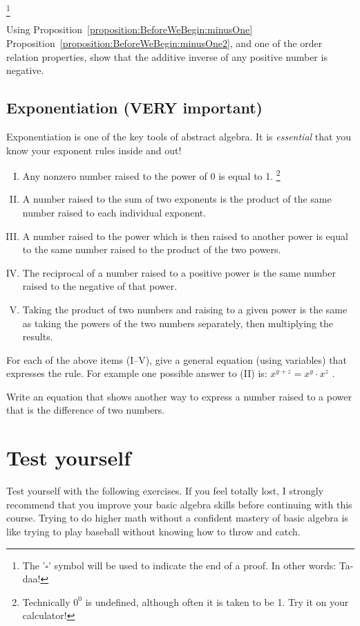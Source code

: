 \footnote{The '$\square$' symbol will be used to indicate the end of a proof. In other words: Ta-daa!}

\begin{exercise}{}
Using Proposition~\ref{proposition:BeforeWeBegin:minusOne}  Proposition~\ref{proposition:BeforeWeBegin:minusOne2}, and one of the order relation properties, show that the additive inverse of any positive number is negative.
\end{exercise}


\subsection {Exponentiation (VERY important)}

Exponentiation is one of the key tools of abstract algebra. It is \emph{essential} that you know your exponent rules inside and out!  

\begin{enumerate}[(I)]
\item
Any nonzero number raised to the power of 0 is equal to 1.
\footnote{ Technically $0^0$ is undefined, although often it is taken to be 1. Try it on your calculator!}
\item
A number raised to the sum of two exponents  is the product of the same number raised to each individual exponent.
\item
A number raised to the power which is then raised to another power is equal to the same number raised to the product of the two powers.
\item
The reciprocal of a number raised to a positive power is the same number raised to the negative of that power.
\item
Taking the  product of two numbers  and raising to a given power is the same as taking the powers of the two numbers separately, then multiplying the results.
\end{enumerate}

\begin{exercise}{5}
For each of the above items (I--V),  give a general equation (using variables) that expresses the rule.  For example one possible answer to (II) is:  $x^{y+z} = x^y \cdot x^z$ .
\end{exercise}
\begin{exercise}{6}
Write an equation that shows another way to express a number raised to a power that is the difference of two numbers.
\end{exercise}

\section{Test yourself}
\label{sec:TestYourself}
Test yourself with the following exercises. If you feel totally lost, I strongly recommend that you improve your basic algebra skills before continuing with this course. Trying to do higher math without a confident mastery of basic algebra is like trying to play baseball without knowing how to throw and catch.


